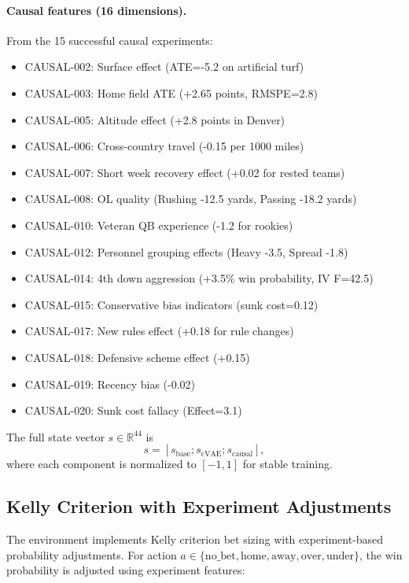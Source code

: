 \paragraph{Causal features (16 dimensions).}
From the 15 successful causal experiments:
\begin{itemize}
  \item CAUSAL-002: Surface effect (ATE=-5.2 on artificial turf)
  \item CAUSAL-003: Home field ATE (+2.65 points, RMSPE=2.8)
  \item CAUSAL-005: Altitude effect (+2.8 points in Denver)
  \item CAUSAL-006: Cross-country travel (-0.15 per 1000 miles)
  \item CAUSAL-007: Short week recovery effect (+0.02 for rested teams)
  \item CAUSAL-008: OL quality (Rushing -12.5 yards, Passing -18.2 yards)
  \item CAUSAL-010: Veteran QB experience (-1.2 for rookies)
  \item CAUSAL-012: Personnel grouping effects (Heavy -3.5, Spread -1.8)
  \item CAUSAL-014: 4th down aggression (+3.5\% win probability, IV F=42.5)
  \item CAUSAL-015: Conservative bias indicators (sunk cost=0.12)
  \item CAUSAL-017: New rules effect (+0.18 for rule changes)
  \item CAUSAL-018: Defensive scheme effect (+0.15)
  \item CAUSAL-019: Recency bias (-0.02)
  \item CAUSAL-020: Sunk cost fallacy (Effect=3.1)
\end{itemize}

The full state vector $s \in \mathbb{R}^{44}$ is
\[
s = [s_{\text{base}}; s_{\text{cVAE}}; s_{\text{causal}}],
\]
where each component is normalized to $[-1, 1]$ for stable training.

\subsection{Kelly Criterion with Experiment Adjustments}

The environment implements Kelly criterion bet sizing with experiment-based probability adjustments. For action $a \in \{\text{no\_bet}, \text{home}, \text{away}, \text{over}, \text{under}\}$, the win probability is adjusted using experiment features:

